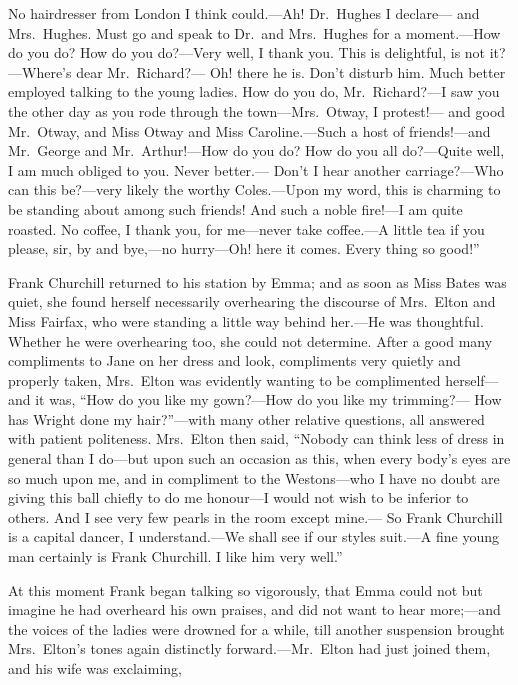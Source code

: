 No hairdresser from London I think could.---Ah! Dr.\ Hughes I declare---%
and Mrs.\ Hughes.  Must go and speak to Dr.\ and Mrs.\ Hughes for
a moment.---How do you do?  How do you do?---Very well, I thank you.
This is delightful, is not it?---Where's dear Mr.\ Richard?---%
Oh! there he is.  Don't disturb him.  Much better employed talking
to the young ladies.  How do you do, Mr.\ Richard?---I saw you the
other day as you rode through the town---Mrs.\ Otway, I protest!---%
and good Mr.\ Otway, and Miss Otway and Miss Caroline.---Such a host
of friends!---and Mr.\ George and Mr.\ Arthur!---How do you do?  How do
you all do?---Quite well, I am much obliged to you.  Never better.---%
Don't I hear another carriage?---Who can this be?---very likely the
worthy Coles.---Upon my word, this is charming to be standing about
among such friends!  And such a noble fire!---I am quite roasted.
No coffee, I thank you, for me---never take coffee.---A little tea
if you please, sir, by and bye,---no hurry---Oh! here it comes.
Every thing so good!''

Frank Churchill returned to his station by Emma; and as soon as Miss
Bates was quiet, she found herself necessarily overhearing the
discourse of Mrs.\ Elton and Miss Fairfax, who were standing a little
way behind her.---He was thoughtful.  Whether he were overhearing too,
she could not determine.  After a good many compliments to Jane
on her dress and look, compliments very quietly and properly taken,
Mrs.\ Elton was evidently wanting to be complimented herself---%
and it was, ``How do you like my gown?---How do you like my trimming?---%
How has Wright done my hair?''---with many other relative questions,
all answered with patient politeness.  Mrs.\ Elton then said,
``Nobody can think less of dress in general than I do---but upon such
an occasion as this, when every body's eyes are so much upon me,
and in compliment to the Westons---who I have no doubt are giving
this ball chiefly to do me honour---I would not wish to be inferior
to others.  And I see very few pearls in the room except mine.---%
So Frank Churchill is a capital dancer, I understand.---We shall see
if our styles suit.---A fine young man certainly is Frank Churchill.
I like him very well.''

At this moment Frank began talking so vigorously, that Emma could
not but imagine he had overheard his own praises, and did not want
to hear more;---and the voices of the ladies were drowned for a while,
till another suspension brought Mrs.\ Elton's tones again distinctly
forward.---Mr.\ Elton had just joined them, and his wife was exclaiming,

